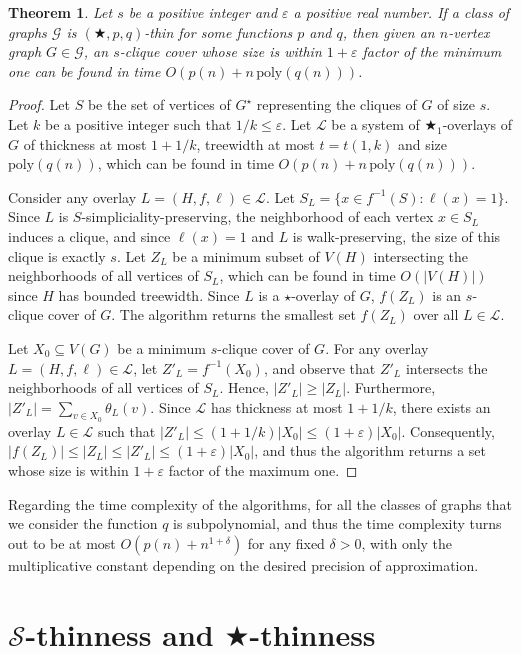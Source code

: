 \documentclass[a4paper,11pt]{article}
\newcommand{\GG}{{\mathcal G}}
\newcommand{\LL}{{\mathcal L}}
\newcommand{\Ss}{{\mathcal S}}
\newcommand{\poly}{\text{poly}}
\newtheorem{theorem}{Theorem}[section]
\begin{document}
\begin{theorem}\label{thm-svcov}
Let $s$ be a positive integer and $\varepsilon$ a positive real number.
If a class of graphs $\GG$ is $(\bigstar,p,q)$-thin for some functions $p$ and $q$, then given an $n$-vertex graph $G\in \GG$,
an $s$-clique cover whose size is within $1+\varepsilon$ factor of the minimum one can be found in time $O(p(n)+n\,\poly(q(n)))$.
\end{theorem}
\begin{proof}
Let $S$ be the set of vertices of $G^\star$ representing the cliques of $G$ of size $s$.
Let $k$ be a positive integer such that $1/k\le \varepsilon$.
Let $\LL$ be a system of $\bigstar_1$-overlays of $G$ of thickness at most $1+1/k$, treewidth at most $t=t(1,k)$ and size $\poly(q(n))$,
which can be found in time $O(p(n)+n\,\poly(q(n)))$.

Consider any overlay $L=(H,f,\ell)\in\LL$.  Let $S_L=\{x\in f^{-1}(S): \ell(x)=1\}$.
Since $L$ is $S$-simpliciality-preserving, the neighborhood of each vertex $x\in S_L$ induces a clique,
and since $\ell(x)=1$ and $L$ is walk-preserving, the size of this clique is exactly $s$.
Let $Z_L$ be a minimum subset of $V(H)$ intersecting the neighborhoods of all vertices of $S_L$, which can be found in time $O(|V(H)|)$ since $H$ has bounded
treewidth.  Since $L$ is a $\star$-overlay of $G$, $f(Z_L)$ is an $s$-clique cover of $G$.
The algorithm returns the smallest set $f(Z_L)$ over all $L\in\LL$.

Let $X_0\subseteq V(G)$ be a minimum $s$-clique cover of $G$.
For any overlay $L=(H,f,\ell)\in\LL$, let $Z'_L=f^{-1}(X_0)$, and observe that $Z'_L$ intersects
the neighborhoods of all vertices of $S_L$.  Hence, $|Z'_L|\ge |Z_L|$.
Furthermore, $|Z'_L|=\sum_{v\in X_0}\theta_L(v)$.
Since $\LL$ has thickness at most $1+1/k$, there exists an overlay $L\in\LL$ such that $|Z'_L|\le (1+1/k)|X_0|\le (1+\varepsilon)|X_0|$.
Consequently, $|f(Z_L)|\le |Z_L|\le |Z'_L|\le (1+\varepsilon)|X_0|$,
and thus the algorithm returns a set whose size is within $1+\varepsilon$ factor of the maximum one.
\end{proof}

Regarding the time complexity of the algorithms, for all the classes of graphs that we consider the function $q$ is subpolynomial,
and thus the time complexity turns out to be at most $O(p(n)+n^{1+\delta})$ for any fixed $\delta>0$, with only the multiplicative
constant depending on the desired precision of approximation.

\section{$\Ss$-thinness and $\bigstar$-thinness}
\end{document}
